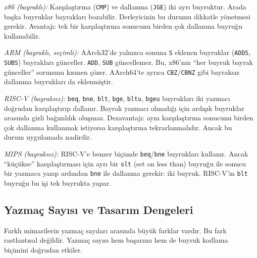 \begin{karsilastirma}
\emph{x86 (bayraklı):} Karşılaştırma (\texttt{CMP}) ve dallanma (\texttt{JGE}) iki ayrı buyruktur. Arada başka buyruklar bayrakları bozabilir. Derleyicinin bu durumu dikkatle yönetmesi gerekir. Avantajı: tek bir karşılaştırma sonucunu birden çok dallanma buyruğu kullanabilir.

\emph{ARM (bayraklı, seçimli):} AArch32'de yalnızca sonuna \texttt{S} eklenen buyruklar (\texttt{ADDS}, \texttt{SUBS}) bayrakları günceller. \texttt{ADD}, \texttt{SUB} güncellemez. Bu, x86'nın ``her buyruk bayrak günceller'' sorununu kısmen çözer. AArch64'te ayrıca \texttt{CBZ}/\texttt{CBNZ} gibi bayraksız dallanma buyrukları da eklenmiştir.

\emph{RISC-V (bayraksız):} \texttt{beq}, \texttt{bne}, \texttt{blt}, \texttt{bge}, \texttt{bltu}, \texttt{bgeu} buyrukları iki yazmacı doğrudan karşılaştırıp dallanır. Bayrak yazmacı olmadığı için ardışık buyruklar arasında gizli bağımlılık oluşmaz. Dezavantajı: aynı karşılaştırma sonucunu birden çok dallanma kullanmak istiyorsa karşılaştırma tekrarlanmalıdır. Ancak bu durum uygulamada nadirdir.

\emph{MIPS (bayraksız):} RISC-V'e benzer biçimde \texttt{beq}/\texttt{bne} buyrukları kullanır. Ancak ``küçükse'' karşılaştırması için ayrı bir \texttt{slt} (set on less than) buyruğu ile sonucu bir yazmaca yazıp ardından \texttt{bne} ile dallanma gerekir: iki buyruk. RISC-V'in \texttt{blt} buyruğu bu işi tek buyrukta yapar.
\end{karsilastirma}

\subsection{Yazmaç Sayısı ve Tasarım Dengeleri}
\label{subsec:yazmac-sayisi-dengesi}

Farklı mimarilerin yazmaç sayıları arasında büyük farklar vardır. Bu fark rastlantısal değildir. Yazmaç sayısı hem başarımı hem de buyruk kodlama biçimini doğrudan etkiler.

